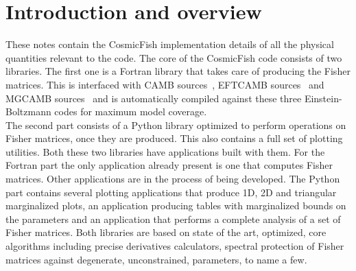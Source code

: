 \documentclass[prd,nofootinbib,showpacs]{revtex4}
\begin{document}
\section{Introduction and overview}
%
These notes contain the CosmicFish implementation details of all the physical quantities relevant to the code.
%
The core of the CosmicFish code consists of two libraries. The first one is a Fortran library that takes care of producing the Fisher matrices. This is interfaced with CAMB sources~\cite{Lewis:1999bs, Challinor:2011bk}, EFTCAMB sources~\cite{Hu:2013twa, Raveri:2014cka} and MGCAMB sources~\cite{Zhao:2008bn, Hojjati:2011ix} and is automatically compiled against these three Einstein-Boltzmann codes for maximum model coverage. \\
% 
The second part consists of a Python library optimized to perform operations on Fisher matrices, once they are produced. This also contains a full set of plotting utilities.
%
Both these two libraries have applications built with them. For the Fortran part the only application already present is one that computes Fisher matrices. Other applications are in the process of being developed.
The Python part contains several plotting applications that produce 1D, 2D and triangular marginalized plots, an application producing tables with marginalized bounds on the parameters and an application that performs a complete analysis of a set of Fisher matrices.
%
Both libraries are based on state of the art, optimized, core algorithms including precise derivatives calculators, spectral protection of Fisher matrices against degenerate, unconstrained, parameters, to name a few. 
\end{document}
